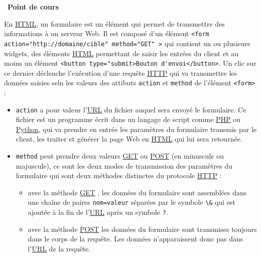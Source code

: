 \documentclass[
  11pt,
]{article}
\newcommand{\passthrough}[1]{#1}
\providecommand{\tightlist}{%
  \setlength{\itemsep}{0pt}\setlength{\parskip}{0pt}}
\newcounter{cours}
\newenvironment{cours}[1]
{\par \medskip   \addtocounter{cours}{1} \noindent  
\begin{bclogo}[arrondi =0.1,  ombre = true, barre=none, logo=\bcbook, marge=4]{~\textbf{Point de cours} \textbf{\thecours} {\itshape #1} }  \par}
{
\end{bclogo}
 \par \bigskip }
\newcounter{prog}
\begin{document}
\begin{cours}{}

En \href{https://developer.mozilla.org/fr/docs/Glossaire/HTML}{HTML}, un
formulaire est un élément qui permet de transmettre des informations à
un serveur Web. Il est composé d'un élément
\passthrough{\lstinline!<form action="http://domaine/cible" method="GET" >!}
qui contient un ou plusieurs widgets, des éléments
\href{https://developer.mozilla.org/fr/docs/Glossaire/HTML}{HTML}
permettant de saisir les entrées du client et au moins un élément
\passthrough{\lstinline!<button type="submit>Bouton d'envoi</button>!}.
Un clic sur ce dernier déclenche l'exécution d'une requête
\href{https://developer.mozilla.org/fr/docs/Glossaire/HTTP}{HTTP} qui va
transmettre les données saisies seln les valeurs des attibuts
\passthrough{\lstinline!action!} et \passthrough{\lstinline!method!} de
l'élément \passthrough{\lstinline!<form>!} :

\begin{itemize}
\tightlist
\item
  \passthrough{\lstinline!action!} a pour valeur
  l'\href{https://developer.mozilla.org/fr/docs/Glossaire/URL}{URL} du
  fichier auquel sera envoyé le formulaire. Ce fichier est un programme
  écrit dans un langage de script comme
  \href{https://developer.mozilla.org/fr/docs/Glossaire/PHP}{PHP} ou
  \href{https://docs.python.org/3.7/library/cgi.html}{Python}, qui va
  prendre en entrée les paramètres du formulaire transmis par le client,
  les traiter et générer la page Web en
  \href{https://developer.mozilla.org/fr/docs/Glossaire/HTML}{HTML} qui
  lui sera retournée.
\item
  \passthrough{\lstinline!method!} peut prendre deux valeurs
  \href{https://developer.mozilla.org/fr/docs/Web/HTTP/M\%C3\%A9thode/GET}{GET}
  ou
  \href{https://developer.mozilla.org/fr/docs/Web/HTTP/M\%C3\%A9thode/POST}{POST}
  (en minuscule ou majuscule), ce sont les deux modes de transmission
  des paramètres du formulaire qui sont deux méthodes distinctes du
  protocole
  \href{https://developer.mozilla.org/fr/docs/Glossaire/HTTP}{HTTP} :

  \begin{itemize}
  \tightlist
  \item
    avec la méthode
    \href{https://developer.mozilla.org/fr/docs/Web/HTTP/M\%C3\%A9thode/GET}{GET}
    , les données du formulaire sont assemblées dans une chaîne de
    paires \passthrough{\lstinline!nom=valeur!} séparées par le symbole
    \passthrough{\lstinline!\&!} qui est ajoutée à la fin de
    l'\href{https://developer.mozilla.org/fr/docs/Glossaire/URL}{URL}
    après un symbole \passthrough{\lstinline!?!}.
  \item
    avec la méthode
    \href{https://developer.mozilla.org/fr/docs/Web/HTTP/M\%C3\%A9thode/POST}{POST}
    les données du formulaire sont transmises toujours dans le corps de
    la requête. Les données n'apparaissent donc pas dans
    l'\href{https://developer.mozilla.org/fr/docs/Glossaire/URL}{URL} de
    la requête.
  \end{itemize}
\end{itemize}


\end{cours}
\end{document}
